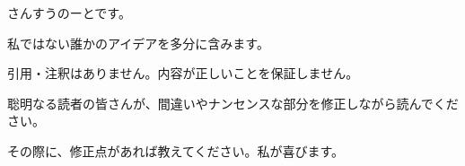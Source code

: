 
さんすうのーとです。

私ではない誰かのアイデアを多分に含みます。

引用・注釈はありません。内容が正しいことを保証しません。

聡明なる読者の皆さんが、間違いやナンセンスな部分を修正しながら読んでください。

その際に、修正点があれば教えてください。私が喜びます。